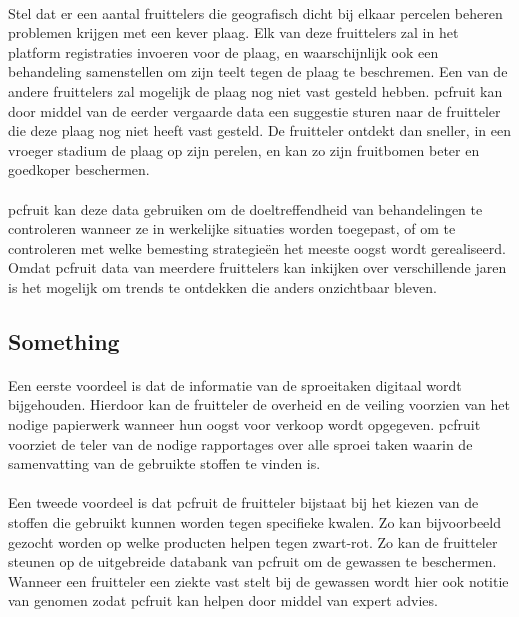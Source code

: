 \paragraph {} Stel dat er een aantal fruittelers die geografisch dicht bij elkaar percelen
beheren problemen krijgen met een kever plaag. Elk van deze fruittelers zal in het
platform registraties invoeren voor de plaag, en waarschijnlijk ook een behandeling
samenstellen om zijn teelt tegen de plaag te beschremen. Een van de andere fruittelers zal
mogelijk de plaag nog niet vast gesteld hebben. pcfruit kan door middel van de eerder
vergaarde data een suggestie sturen naar de fruitteler die deze plaag nog niet heeft vast
gesteld. De fruitteler ontdekt dan sneller, in een vroeger stadium de plaag op zijn perelen, en
kan zo zijn fruitbomen beter en goedkoper beschermen.

\paragraph {} pcfruit  kan deze data gebruiken om de doeltreffendheid van behandelingen te
controleren wanneer ze in werkelijke situaties worden toegepast, of om te controleren met
welke bemesting strategie\"en het meeste oogst wordt gerealiseerd. Omdat pcfruit data van
meerdere fruittelers kan inkijken over verschillende jaren is het mogelijk om trends te
ontdekken die anders onzichtbaar bleven.

\paragraph {} 


\subsection {Something}


\paragraph {} Een eerste voordeel is dat de informatie van de sproeitaken digitaal wordt
bijgehouden. Hierdoor kan de fruitteler de overheid en de veiling voorzien van het
nodige papierwerk wanneer hun oogst voor verkoop wordt opgegeven. pcfruit voorziet de
teler van de nodige rapportages over alle sproei taken waarin de samenvatting van de
gebruikte stoffen te vinden is.

\paragraph {} Een tweede voordeel is dat pcfruit de fruitteler bijstaat bij het kiezen van de
stoffen die gebruikt kunnen worden tegen specifieke kwalen. Zo kan bijvoorbeeld gezocht
worden op welke producten helpen tegen zwart-rot. Zo kan de fruitteler steunen op de
uitgebreide databank van pcfruit om de gewassen te beschermen. Wanneer een fruitteler een
ziekte vast stelt bij de gewassen wordt hier ook notitie van genomen zodat pcfruit kan
helpen door middel van expert advies.

